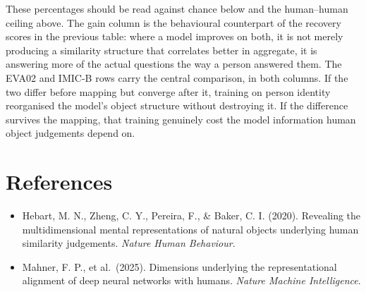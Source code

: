 \documentclass[11pt]{article}
\begin{document}
These percentages should be read against chance below and the human--human ceiling above. The gain
column is the behavioural counterpart of the recovery scores in the previous table: where a model
improves on both, it is not merely producing a similarity structure that correlates better in
aggregate, it is answering more of the actual questions the way a person answered them. The EVA02
and IMIC-B rows carry the central comparison, in both columns. If the two differ before mapping but
converge after it, training on person identity reorganised the model's object structure without
destroying it. If the difference survives the mapping, that training genuinely cost the model
information human object judgements depend on.

\section*{References}

\begin{itemize}[leftmargin=1.6em,itemsep=4pt]
  \item Hebart, M. N., Zheng, C. Y., Pereira, F., \& Baker, C. I. (2020). Revealing the
  multidimensional mental representations of natural objects underlying human similarity
  judgements. \emph{Nature Human Behaviour}.
  \item Mahner, F. P., et al.\ (2025). Dimensions underlying the representational alignment of deep
  neural networks with humans. \emph{Nature Machine Intelligence}.
\end{itemize}
\end{document}
